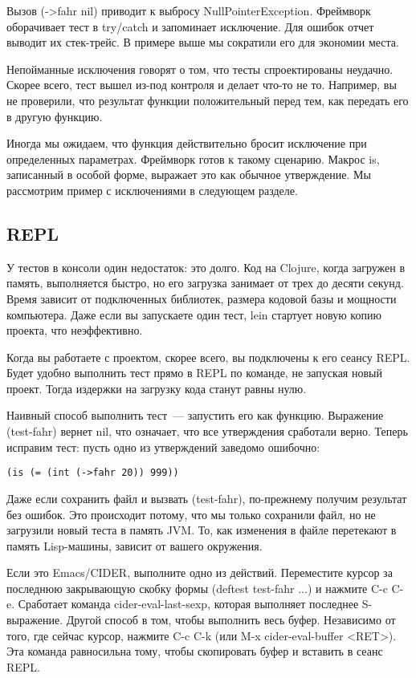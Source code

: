 Вызов (->fahr nil) приводит к выбросу NullPointerException. Фреймворк
оборачивает тест в try/catch и запоминает исключение. Для ошибок отчет выводит
их стек-трейс. В примере выше мы сократили его для экономии места.

Непойманные исключения говорят о том, что тесты спроектированы неудачно. Скорее
всего, тест вышел из-под контроля и делает что-то не то. Например, вы не
проверили, что результат функции положительный перед тем, как передать его в
другую функцию.

Иногда мы ожидаем, что функция действительно бросит исключение при определенных
параметрах. Фреймворк готов к такому сценарию. Макрос is, записанный в особой
форме, выражает это как обычное утверждение. Мы рассмотрим пример с исключениями
в следующем разделе.

\subsection{REPL}

У тестов в консоли один недостаток: это долго. Код на Clojure, когда загружен в
память, выполняется быстро, но его загрузка занимает от трех до десяти
секунд. Время зависит от подключенных библиотек, размера кодовой базы и мощности
компьютера. Даже если вы запускаете один тест, lein стартует новую копию
проекта, что неэффективно.

Когда вы работаете с проектом, скорее всего, вы подключены к его сеансу
REPL. Будет удобно выполнить тест прямо в REPL по команде, не запуская новый
проект. Тогда издержки на загрузку кода станут равны нулю.

Наивный способ выполнить тест~--- запустить его как функцию. Выражение (test-fahr)
вернет nil, что означает, что все утверждения сработали верно. Теперь исправим
тест: пусть одно из утверждений заведомо ошибочно:

\begin{verbatim}
(is (= (int (->fahr 20)) 999))
\end{verbatim}

Даже если сохранить файл и вызвать (test-fahr), по-прежнему получим результат
без ошибок. Это происходит потому, что мы только сохранили файл, но не загрузили
новый теста в память JVM. То, как изменения в файле перетекают в память
Lisp-машины, зависит от вашего окружения.

Если это Emacs/CIDER, выполните одно из действий. Переместите курсор за
последнюю закрывающую скобку формы (deftest test-fahr ...) и нажмите C-c
C-e. Сработает команда cider-eval-last-sexp, которая выполняет последнее
S-выражение. Другой способ в том, чтобы выполнить весь буфер. Независимо от
того, где сейчас курсор, нажмите C-c C-k (или M-x cider-eval-buffer <RET>). Эта
команда равносильна тому, чтобы скопировать буфер и вставить в сеанс REPL.

